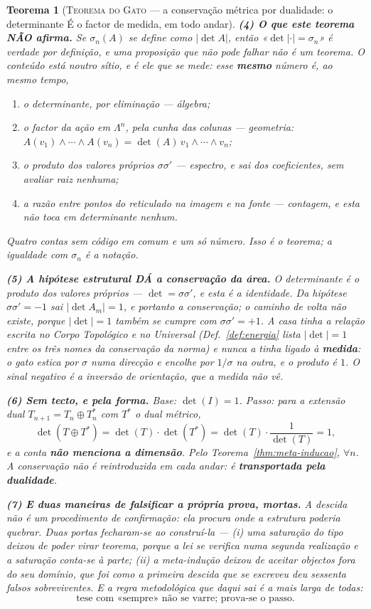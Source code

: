 \documentclass[11pt,a4paper]{article}
\newtheorem{teorema}{Teorema}
\begin{document}
\begin{teorema}[\textsc{Teorema do Gato} --- a conservação métrica por
dualidade: o determinante É o factor de medida, em todo
andar]
\textbf{(4) O que este teorema NÃO afirma.} Se $\sigma_{n}(A)$ se
\emph{define} como $|\det A|$, então «$\det|\cdot|=\sigma_{n}$» é verdade
por definição, e uma proposição que não pode falhar não é um teorema. O
conteúdo está noutro sítio, e é ele que se mede: esse \textbf{mesmo}
número é, ao mesmo tempo,
\begin{enumerate}
\item o determinante, por eliminação --- \emph{álgebra};
\item o factor da ação em $\Lambda^{n}$, pela cunha das colunas ---
\emph{geometria}: $A(v_{1})\wedge\cdots\wedge A(v_{n})=\det(A)\,
v_{1}\wedge\cdots\wedge v_{n}$;
\item o produto dos valores próprios $\sigma\sigma'$ --- \emph{espectro},
e sai dos coeficientes, sem avaliar raiz nenhuma;
\item a razão entre pontos do reticulado na imagem e na fonte ---
\emph{contagem}, e esta não toca em determinante nenhum.
\end{enumerate}
Quatro contas sem código em comum e um só número. \emph{Isso} é o
teorema; a igualdade com $\sigma_{n}$ é a notação.

\textbf{(5) A hipótese estrutural DÁ a conservação da área.} O
determinante é o produto dos valores próprios --- $\det=\sigma\sigma'$, e
\emph{esta} é a identidade. Da hipótese $\sigma\sigma'=-1$ sai
$|\det A_{m}|=1$, e portanto a conservação; o caminho de volta não
existe, porque $|\det|=1$ também se cumpre com $\sigma\sigma'=+1$. A casa tinha a relação escrita no \emph{Corpo Topológico} e no
Universal (Def.~\ref{def:energia} lista $|\det|=1$ entre os três nomes
da conservação da norma) e nunca a tinha ligado à \textbf{medida}: o
gato estica por $\sigma$ numa direcção e encolhe por $1/\sigma$ na
outra, e o produto é $1$. O sinal negativo é a inversão de orientação,
que a medida não vê.

\textbf{(6) Sem tecto, e pela forma.} Base: $\det(I)=1$. Passo: para a
extensão dual $T_{n+1}=T_{n}\oplus T_{n}^{\ast}$ com $T^{\ast}$ o dual
métrico,
\[
\det(T\oplus T^{\ast})=\det(T)\cdot\det(T^{\ast})
=\det(T)\cdot\frac{1}{\det(T)}=1,
\]
e a conta \textbf{não menciona a dimensão}. Pelo
Teorema~\ref{thm:meta-inducao}, $\forall n$. A conservação não é
reintroduzida em cada andar: é \textbf{transportada pela dualidade}.

\textbf{(7) E duas maneiras de falsificar a própria prova, mortas.} A
descida não é um procedimento de confirmação: ela procura \emph{onde a
estrutura poderia quebrar}. Duas portas fecharam-se ao construí-la ---
(i) uma \emph{saturação} do tipo deixou de poder virar teorema, porque a
lei se verifica numa segunda realização e a saturação conta-se à parte;
(ii) a meta-indução deixou de aceitar objectos \emph{fora do seu
domínio}, que foi como a primeira descida que se escreveu deu sessenta
falsos sobreviventes. E a regra metodológica que daqui sai é a mais
larga de todas:
\[
\boxed{\;\text{tese com «sempre» não se varre; prova-se o passo.}\;}
\]


\end{teorema}
\end{document}
